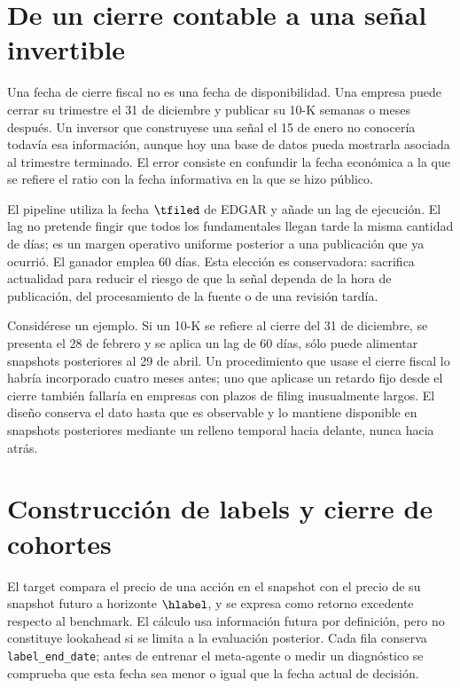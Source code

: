 \section{De un cierre contable a una señal invertible}

Una fecha de cierre fiscal no es una fecha de disponibilidad. Una empresa puede cerrar su trimestre
el 31 de diciembre y publicar su 10-K semanas o meses después. Un inversor que construyese una señal
el 15 de enero no conocería todavía esa información, aunque hoy una base de datos pueda mostrarla
asociada al trimestre terminado. El error consiste en confundir la fecha económica a la que se
refiere el ratio con la fecha informativa en la que se hizo público.

El pipeline utiliza la fecha \(\tfiled\) de EDGAR y añade un lag de ejecución. El lag no pretende
fingir que todos los fundamentales llegan tarde la misma cantidad de días; es un margen operativo
uniforme posterior a una publicación que ya ocurrió. El ganador emplea 60 días. Esta elección es
conservadora: sacrifica actualidad para reducir el riesgo de que la señal dependa de la hora de
publicación, del procesamiento de la fuente o de una revisión tardía.

Considérese un ejemplo. Si un 10-K se refiere al cierre del 31 de diciembre, se presenta el 28 de
febrero y se aplica un lag de 60 días, sólo puede alimentar snapshots posteriores al 29 de abril. Un
procedimiento que usase el cierre fiscal lo habría incorporado cuatro meses antes; uno que aplicase
un retardo fijo desde el cierre también fallaría en empresas con plazos de filing inusualmente
largos. El diseño conserva el dato hasta que es observable y lo mantiene disponible en snapshots
posteriores mediante un relleno temporal hacia delante, nunca hacia atrás.

\section{Construcción de labels y cierre de cohortes}

El target compara el precio de una acción en el snapshot con el precio de su snapshot futuro a
horizonte \(\hlabel\), y se expresa como retorno excedente respecto al benchmark. El cálculo usa
información futura por definición, pero no constituye lookahead si se limita a la evaluación
posterior. Cada fila conserva \texttt{label\_end\_date}; antes de entrenar el meta-agente o medir
un diagnóstico se comprueba que esta fecha sea menor o igual que la fecha actual de decisión.

